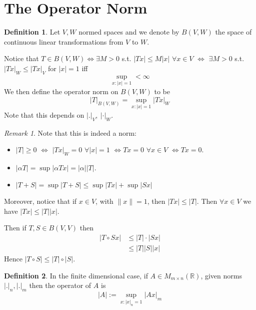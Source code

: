 \documentclass[11pt,openany]{book}
\theoremstyle{plain}
\theoremstyle{definition}
\newtheorem{definition}{Definition}[chapter]
\theoremstyle{remark}
\newtheorem{remark}{Remark}[chapter]
\newcommand{\R}{\mathbb{R}}
\newcommand{\abs}[1]{\lvert #1 \rvert}
\begin{document}
\section{The Operator Norm} 
\begin{definition}
    Let $V,W$ normed spaces and we denote by $B(V,W)$ the space of continuous linear transformations  
    from $V$ to $W$. 

    Notice that $T \in B(V,W) \iff \exists M > 0$ s.t. $\abs{Tx} \le M \abs{x}$ $\forall x \in V$ $\iff$
    $\exists M > 0$ s.t. $\abs{Tx}_W \le \abs{Tx}_V$ for $\abs{x} = 1$ iff 
    $$\sup_{x \colon \abs{x} = 1} < \infty$$
    We then define the operator norm on $B(V,W)$ to be 
    $$\abs{T}_{B(V,W)} = \sup_{x \colon \abs{x} = 1} \abs{Tx}_W$$
    Note that this depends on $\abs{.}_V, \ \abs{\cdot}_W$.
\end{definition}

\begin{remark}
    Note that this is indeed a norm: 
    \begin{itemize}
        \item $\abs{T} \ge 0$ $\iff$ $\abs{Tx}_W = 0$ $\forall \abs{x} = 1$ $\iff Tx = 0$ $\forall x \in V$ 
        $\iff Tx = 0$. 

        \item $\abs{\alpha T} = \sup \abs{\alpha Tx} = \abs{\alpha} \abs{T}$. 
        
        \item $\abs{T+S} = \sup \abs{T+S} \le \sup \abs{Tx} + \sup \abs{Sx}$ 
    \end{itemize}

    Moreover, notice that if $x \in V$, with $\|x\| = 1$, then $\abs{Tx} \le \abs{T}$. 
    Then $\forall x \in V$ we have $\abs{Tx} \le \abs{T} \abs{x}$. 

    Then if $T,S \in B(V,V)$ then 
    \begin{align*}
        \abs{T \circ S x} &\le \abs{T} \cdot \abs{Sx} \\
        &\le \abs{T} \abs{S} \abs{x} 
    \end{align*}
    Hence $\abs{T \circ S} \le \abs{T} \circ \abs{S}$.
\end{remark}

\begin{definition}
    In the finite dimensional case, if $A \in M_{m \times n} (\R)$, 
    given norms $\abs{.}_n, \abs{.}_m$ then the operator of $A$ is 
    $$\abs{A} := \sup_{x \colon \abs{x}_n = 1} \abs{Ax}_m$$
\end{definition}
\end{document}
